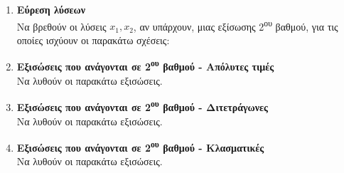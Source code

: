 \documentclass[twoside,nofonts,internet]{askhseis}
\newcommand{\tss}[1]{\textsuperscript{#1}}
\begin{document}
\begin{enumerate}
\begin{rlist}
\end{rlist}
\item \textbf{Εύρεση λύσεων}\\
Να βρεθούν οι λύσεις $ x_1, x_2 $, αν υπάρχουν, μιας εξίσωσης 2\tss{ου} βαθμού, για τις οποίες ισχύουν οι παρακάτω σχέσεις:
\item \textbf{Εξισώσεις που ανάγονται σε 2\tss{ου} βαθμού - Απόλυτες τιμές}\\
Να λυθούν οι παρακάτω εξισώσεις.
\begin{multicols}{2}
\end{multicols}
\item \textbf{Εξισώσεις που ανάγονται σε 2\tss{ου} βαθμού - Διτετράγωνες}\\
Να λυθούν οι παρακάτω εξισώσεις.
\begin{multicols}{2}
\end{multicols}
\item \textbf{Εξισώσεις που ανάγονται σε 2\tss{ου} βαθμού - Κλασματικές}\\
Να λυθούν οι παρακάτω εξισώσεις.

\end{enumerate}
\end{document}
